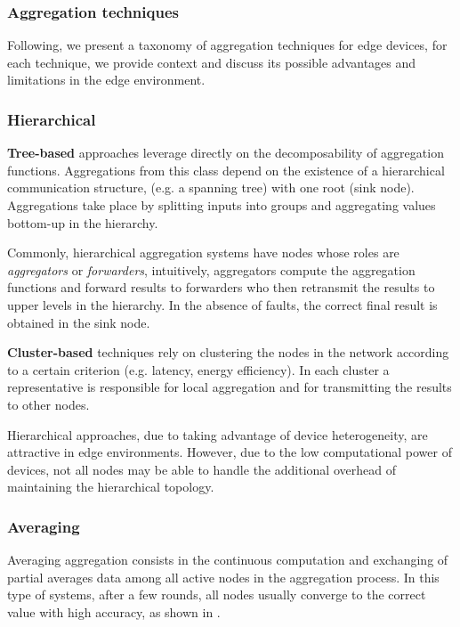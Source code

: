 \subsubsection{Aggregation techniques}

Following, we present a taxonomy of aggregation techniques for edge devices, for each technique, we provide context and discuss its possible advantages and limitations in the edge environment.

\subsubsection{Hierarchical}

\textbf{Tree-based} approaches leverage directly on the decomposability of aggregation functions. Aggregations from this class depend on the existence of a hierarchical communication structure, (e.g. a spanning tree) with one root (sink node). Aggregations take place by splitting inputs into groups and aggregating values bottom-up in the hierarchy. 

Commonly, hierarchical aggregation systems have nodes whose roles are \textit{aggregators} or \textit{forwarders}, intuitively, aggregators compute the aggregation functions and forward results to forwarders who then retransmit the results to upper levels in the hierarchy. In the absence of faults, the correct final result is obtained in the sink node.

\textbf{Cluster-based} techniques rely on clustering the nodes in the network according to a certain criterion (e.g. latency, energy efficiency). In each cluster a representative is responsible for local aggregation and for transmitting the results to other nodes. 

Hierarchical approaches, due to taking advantage of device heterogeneity, are attractive in edge environments. However, due to the low computational power of devices, not all nodes may be able to handle the additional overhead of maintaining the hierarchical topology.

\subsubsection{Averaging}

Averaging aggregation consists in the continuous computation and exchanging of partial averages data among all active nodes in the aggregation process. In this type of systems, after a few rounds, all nodes usually converge to the correct value with high accuracy, as shown in \cite{gossip_aggregation}.

